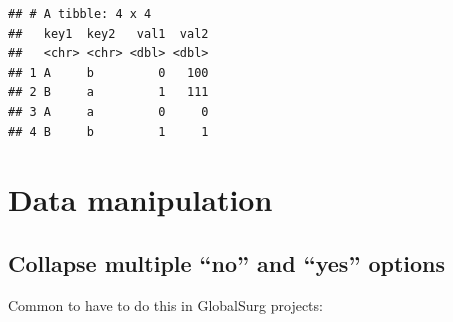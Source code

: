 \documentclass[
]{book}
\begin{document}
\begin{verbatim}
## # A tibble: 4 x 4
##   key1  key2   val1  val2
##   <chr> <chr> <dbl> <dbl>
## 1 A     b         0   100
## 2 B     a         1   111
## 3 A     a         0     0
## 4 B     b         1     1
\end{verbatim}

\hypertarget{data-manipulation}{%
\chapter{Data manipulation}\label{data-manipulation}}

\hypertarget{collapse-multiple-no-and-yes-options}{%
\section{Collapse multiple ``no'' and ``yes'' options}\label{collapse-multiple-no-and-yes-options}}

Common to have to do this in GlobalSurg projects:
\end{document}
